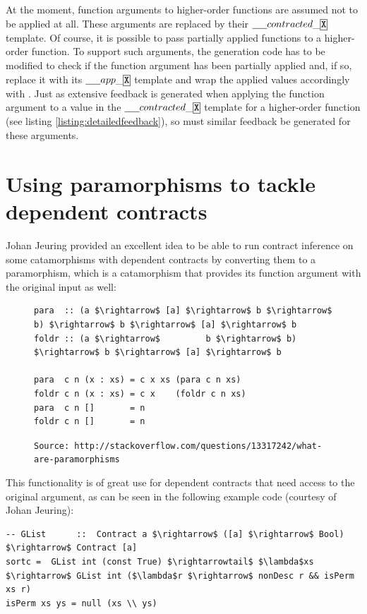 \documentclass[10pt]{report}
\newcommand{\ctrttemplate}{\underline{\hspace{1.5em}}contracted\_\code{X}}
\newcommand{\apptemplate}{\underline{\hspace{1.5em}}app\_\code{X}}
\newcommand{\code}[1]{%
  {%
   \setlength{\fboxsep}{-2\fboxrule}%
   \fcolorbox{black}{light-gray}{\hspace{1.5pt}\strut\texttt{#1}\hspace{1.5pt}}%
  }%
}
\begin{document}
{At the moment, function arguments to higher-order functions are assumed not to be applied at all.
These arguments are replaced by their $\ctrttemplate$ template.
Of course, it is possible to pass partially applied functions to a higher-order function.
To support such arguments, the generation code has to be modified to check if the function argument has been partially applied and, if so, replace it with its $\apptemplate$ template and wrap the applied values accordingly with \code{appParam}.
Just as extensive feedback is generated when applying the function argument to a value in the $\ctrttemplate$ template for a higher-order function (see listing \ref{listing:detailedfeedback}), so must similar feedback be generated for these arguments.

\section{Using paramorphisms to tackle dependent contracts}

Johan Jeuring provided an excellent idea to be able to run contract inference on some catamorphisms with dependent contracts by converting them to a paramorphism, which is a catamorphism that provides its function argument with the original input as well:

\begin{figure}[htps]
\begin{lstlisting}[mathescape]
para  :: (a $\rightarrow$ [a] $\rightarrow$ b $\rightarrow$ b) $\rightarrow$ b $\rightarrow$ [a] $\rightarrow$ b
foldr :: (a $\rightarrow$         b $\rightarrow$ b) $\rightarrow$ b $\rightarrow$ [a] $\rightarrow$ b

para  c n (x : xs) = c x xs (para c n xs)
foldr c n (x : xs) = c x    (foldr c n xs)
para  c n []       = n
foldr c n []       = n
\end{lstlisting}
\texttt{\scriptsize{Source: http://stackoverflow.com/questions/13317242/what-are-paramorphisms}}
\end{figure}

This functionality is of great use for dependent contracts that need access to the original argument, as can be seen in the following example code (courtesy of Johan Jeuring):

\begin{lstlisting}[mathescape]
-- GList      ::  Contract a $\rightarrow$ ([a] $\rightarrow$ Bool) $\rightarrow$ Contract [a]
sortc =  GList int (const True) $\rightarrowtail$ $\lambda$xs $\rightarrow$ GList int ($\lambda$r $\rightarrow$ nonDesc r && isPerm xs r)
isPerm xs ys = null (xs \\ ys)


\end{lstlisting}}
\end{document}
